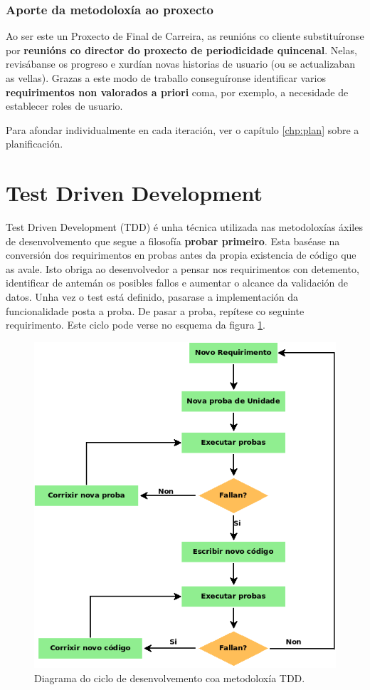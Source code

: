 \subsubsection{Aporte da metodoloxía ao proxecto}

Ao ser este un Proxecto de Final de Carreira, as reunións co cliente substituíronse por \textbf{reunións co director do proxecto de periodicidade quincenal}. Nelas, revisábanse os progreso e xurdían novas historias de usuario (ou se actualizaban as vellas). Grazas a este modo de traballo conseguíronse identificar varios \textbf{requirimentos non valorados a priori} coma, por exemplo, a necesidade de establecer roles de usuario. 

Para afondar individualmente en cada iteración, ver o capítulo \ref{chp:plan} sobre a planificación.


\section{Test Driven Development}

Test Driven Development (TDD) é unha técnica utilizada nas metodoloxías áxiles de desenvolvemento que segue a filosofía \textbf{probar primeiro}. Esta baséase na conversión dos requirimentos en probas antes da propia existencia de código que as avale. Isto obriga ao desenvolvedor a pensar nos requirimentos con detemento, identificar de antemán os posibles fallos e aumentar o alcance da validación de datos. Unha vez o test está definido, pasarase a implementación da funcionalidade posta a proba. De pasar a proba, repítese co seguinte requirimento. Este ciclo pode verse no esquema da figura \ref{fig:tdd}.

\begin{figure}[h]
	\centering
	\includegraphics[scale=0.55,keepaspectratio=true]{./images/TDD.png}
	\caption{Diagrama do ciclo de desenvolvemento coa metodoloxía TDD.}
	\label{fig:tdd}
\end{figure}

